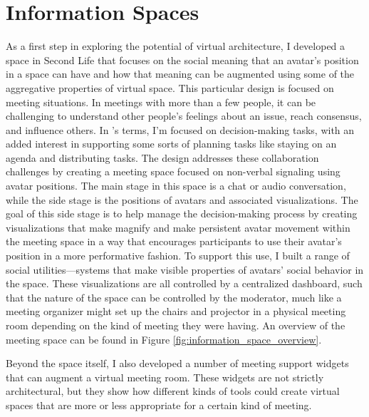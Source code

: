 \section{Information Spaces}
As a first step in exploring the potential of virtual architecture, I developed a space in Second Life that focuses on the social meaning that an avatar's position in a space can have and how that meaning can be augmented using some of the aggregative properties of virtual space. \citep{Harry:2008ww} This particular design is focused on meeting situations. In meetings with more than a few people, it can be challenging to understand other people's feelings about an issue, reach consensus, and influence others. In \citet{McGrath:1984un}'s terms, I'm focused on decision-making tasks, with an added interest in supporting some sorts of planning tasks like staying on an agenda and distributing tasks. The design addresses these collaboration challenges by creating a meeting space focused on non-verbal signaling using avatar positions. The main stage in this space is a chat or audio conversation, while the side stage is the positions of avatars and associated visualizations. The goal of this side stage is to help manage the decision-making process by creating visualizations that make magnify and make persistent avatar movement within the meeting space in a way that encourages participants to use their avatar's position in a more performative fashion. To support this use, I built a range of social utilities---systems that make visible properties of avatars' social behavior in the space. These visualizations are all controlled by a centralized dashboard, such that the nature of the space can be controlled by the moderator, much like a meeting organizer might set up the chairs and projector in a physical meeting room depending on the kind of meeting they were having. An overview of the meeting space can be found in  Figure \ref{fig:information_space_overview}.

Beyond the space itself, I also developed a number of meeting support widgets that can augment a virtual meeting room. These widgets are not strictly architectural, but they show how different kinds of tools could create virtual spaces that are more or less appropriate for a certain kind of meeting.

